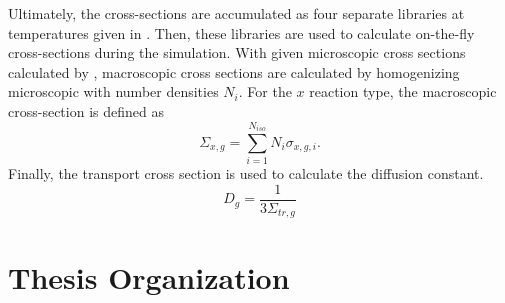     Ultimately, the cross-sections are accumulated as four separate libraries at
    temperatures given in . Then, these libraries are used to
    calculate on-the-fly cross-sections during the simulation.
    With given microscopic cross sections calculated by \mcc, macroscopic cross
    sections are calculated by homogenizing microscopic with number densities
    $N_i$.  For the $x$ reaction type, the macroscopic cross-section is defined
    as
    \begin{equation}
      \Sigma_{x,g} = \sum_{i=1}^{N_{iso}} N_i \sigma_{x,g,i}.
    \end{equation}
    Finally, the transport cross section is used to calculate the diffusion
    constant.
    \begin{equation}
      D_g = \frac{1}{3 \Sigma_{tr,g}}
    \end{equation}

\section{Thesis Organization}
